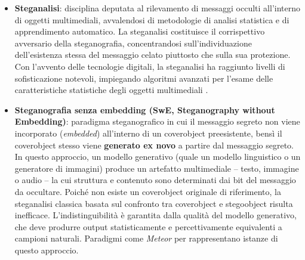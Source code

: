 \begin{itemize}
	\item \textbf{Steganalisi}: disciplina deputata al rilevamento di messaggi occulti all'interno di oggetti multimediali, avvalendosi di metodologie di analisi statistica e di apprendimento automatico. La steganalisi costituisce il corrispettivo avversario della steganografia, concentrandosi sull'individuazione dell'esistenza stessa del messaggio celato piuttosto che sulla sua protezione. Con l'avvento delle tecnologie digitali, la steganalisi ha raggiunto livelli di sofisticazione notevoli, impiegando algoritmi avanzati per l'esame delle caratteristiche statistiche degli oggetti multimediali \cite{apau-24}.
	\item \textbf{Steganografia senza embedding (SwE, Steganography without Embedding)}: paradigma steganografico in cui il messaggio segreto non viene incorporato (\emph{embedded}) all'interno di un coverobject preesistente, bensì il coverobject stesso viene \textbf{generato ex novo} a partire dal messaggio segreto. In questo approccio, un modello generativo (quale un modello linguistico o un generatore di immagini) produce un artefatto multimediale -- testo, immagine o audio -- la cui struttura e contenuto sono determinati dai bit del messaggio da occultare. Poiché non esiste un coverobject originale di riferimento, la steganalisi classica basata sul confronto tra coverobject e stegoobject risulta inefficace. L'indistinguibilità è garantita dalla qualità del modello generativo, che deve produrre output statisticamente e percettivamente equivalenti a campioni naturali. Paradigmi come \emph{Meteor} per rappresentano istanze di questo approccio.
\end{itemize}

